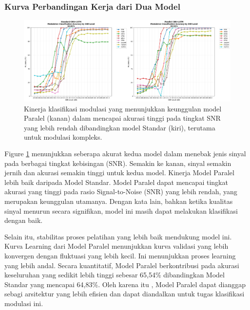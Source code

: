 \documentclass{article}
\begin{document}
\subsubsection{Kurva Perbandingan Kerja dari Dua Model}
\begin{figure}[H]
    \centerline{\includegraphics[width=1.2\textwidth,height=0.3\textheight]{Hasil/line_graph_overall_testing_accuracy_comparing_2model.png}}
    \caption{Kinerja klasifikasi modulasi yang menunjukkan keunggulan model Paralel (kanan) dalam mencapai akurasi tinggi pada tingkat SNR yang lebih rendah dibandingkan model Standar (kiri), terutama untuk modulasi kompleks.}
    \label{fig:Figure 3} 
\end{figure} 
Figure \ref{fig:Figure 3} menunjukkan seberapa akurat kedua model dalam menebak jenis sinyal pada berbagai tingkat kebisingan (SNR). Semakin ke kanan,
sinyal semakin jernih dan akurasi semakin tinggi untuk kedua model. Kinerja Model Paralel lebih baik daripada Model Standar.  
Model Paralel dapat mencapai tingkat akurasi yang tinggi pada rasio Signal-to-Noise (SNR) yang lebih rendah, yang merupakan 
keunggulan utamanya.  Dengan kata lain, bahkan ketika kualitas sinyal menurun secara signifikan, model ini masih dapat melakukan 
klasifikasi dengan baik. 

Selain itu, stabilitas proses pelatihan yang lebih baik mendukung model ini. Kurva Learning dari Model Paralel menunjukkan kurva validasi 
yang lebih konvergen dengan fluktuasi yang lebih kecil. Ini menunjukkan proses learning yang lebih andal. Secara kuantitatif, Model Paralel 
berkontribusi pada akurasi keseluruhan yang sedikit lebih tinggi sebesar 65,54\% dibandingkan Model Standar yang mencapai 64,83\%. Oleh karena itu 
, Model Paralel dapat dianggap sebagi arsitektur yang lebih efisien dan dapat diandalkan untuk tugas klasifikasi modulasi ini.  
\end{document}
